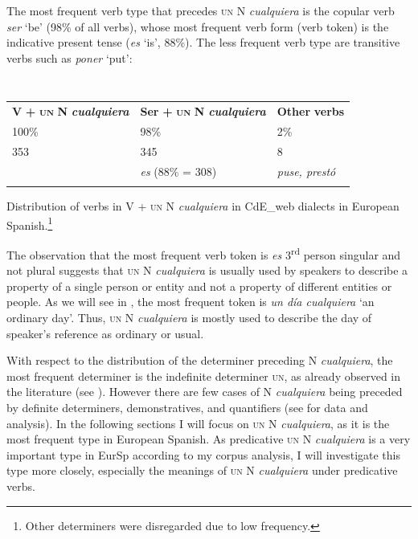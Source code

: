The most frequent verb type that precedes \textsc{un} N \textit{cualquiera} is the copular verb \textit{ser} ‘be’ (98\% of all verbs), whose most frequent verb form (verb token) is the indicative present tense (\textit{es} ‘is’, 88\%). The less frequent verb type are transitive verbs such as \textit{poner} ‘put’:


\begin{table}
\begin{tabularx}{\textwidth}{XXX}
\lsptoprule
 \textbf{V} \textbf{+} \textbf{\textsc{un}} \textbf{N} \textbf{\textit{cualquiera}} & \textbf{Ser} \textbf{+} \textbf{\textsc{un}} \textbf{N} \textbf{\textit{cualquiera}} & \textbf{Other} \textbf{verbs}\\
 100\% & 98\% & 2\%\\
 353 & 345 & 8\\
& \textit{es} (88\% = 308) & \textit{puse, prestó}\\
\lspbottomrule
\end{tabularx}
\caption{\label{tab:} ~}Distribution of verbs in V + \textsc{un} N \textit{cualquiera} in CdE\_web dialects in European Spanish.\footnote{{Other determiners were disregarded due to low frequency.}}
\end{table}

The observation that the most frequent verb token is \textit{es} 3\textsuperscript{rd} person singular and not plural suggests that \textsc{un} N \textit{cualquiera} is usually used by speakers to describe a property of a single person or entity and not a property of different entities or people. As we will see in , the most frequent token is \textit{un día cualquiera} ‘an ordinary day’. Thus, \textsc{un} N \textit{cualquiera} is mostly used to describe the day of speaker’s reference as ordinary or usual. 

  With respect to the distribution of the determiner preceding N \textit{cualquiera}, the most frequent determiner is the indefinite determiner \textsc{un}, as already observed in the literature (see ). However there are few cases of N \textit{cualquiera} being preceded by definite determiners, demonstratives, and quantifiers (see  for data and analysis). In the following sections I will focus on \textsc{un} N \textit{cualquiera}, as it is the most frequent type in European Spanish. As predicative \textsc{un} N \textit{cualquiera} is a very important type in EurSp according to my corpus analysis, I will investigate this type more closely, especially the meanings of \textsc{un} N \textit{cualquiera} under predicative verbs.

